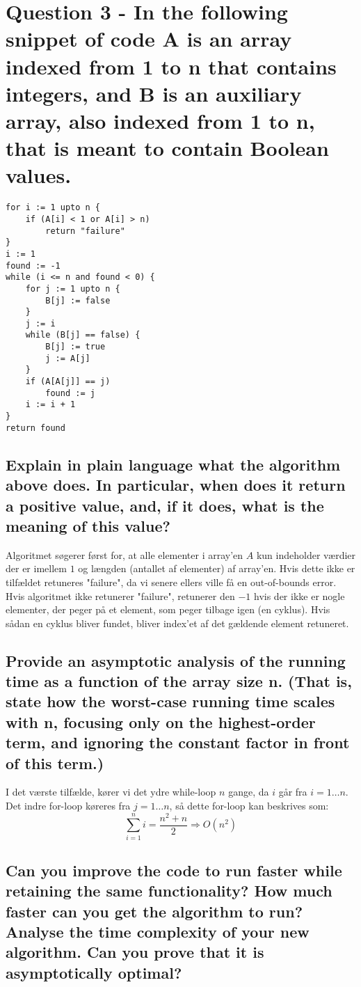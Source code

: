\documentclass[a4paper,12pt]{article}
\begin{document}
\section[Question 3]{Question 3 - In the following snippet of code A is an array indexed from 1 to n that contains integers,
and B is an auxiliary array, also indexed from 1 to n, that is meant to contain Boolean values.}

\begin{lstlisting}
for i := 1 upto n {
    if (A[i] < 1 or A[i] > n)
        return "failure"
}
i := 1
found := -1
while (i <= n and found < 0) {
    for j := 1 upto n {
        B[j] := false
    }
    j := i
    while (B[j] == false) {
        B[j] := true
        j := A[j]
    }
    if (A[A[j]] == j)
        found := j
    i := i + 1
}
return found
\end{lstlisting}
    
\subsection[]{Explain in plain language what the algorithm above does. In particular, when does it
return a positive value, and, if it does, what is the meaning of this value?}
    
Algoritmet søgerer først for, at alle elementer i array'en $A$ kun indeholder værdier der er imellem $1$ og længden (antallet af elementer) af array'en. Hvis dette ikke er tilfældet retuneres "failure", da vi senere ellers ville få en out-of-bounds error. Hvis algoritmet ikke retunerer "failure", retunerer den $-1$ hvis der ikke er nogle elementer, der peger på et element, som peger tilbage igen (en cyklus). Hvis sådan en cyklus bliver fundet, bliver index'et af det gældende element retuneret.
    
\subsection[]{Provide an asymptotic analysis of the running time as a function of the array size n. (That
is, state how the worst-case running time scales with n, focusing only on the highest-order
term, and ignoring the constant factor in front of this term.)}

I det værste tilfælde, kører vi det ydre while-loop $n$ gange, da $i$ går fra $i=1\dots n$. Det indre for-loop køreres fra $j=1\dots n$, så dette for-loop kan beskrives som:
\[\sum_{i=1}^{n}i = \dfrac{n^2+n}{2} \Rightarrow O(n^2)\]

\subsection[]{Can you improve the code to run faster while retaining the same functionality? How
much faster can you get the algorithm to run? Analyse the time complexity of your new
algorithm. Can you prove that it is asymptotically optimal?}
\end{document}
